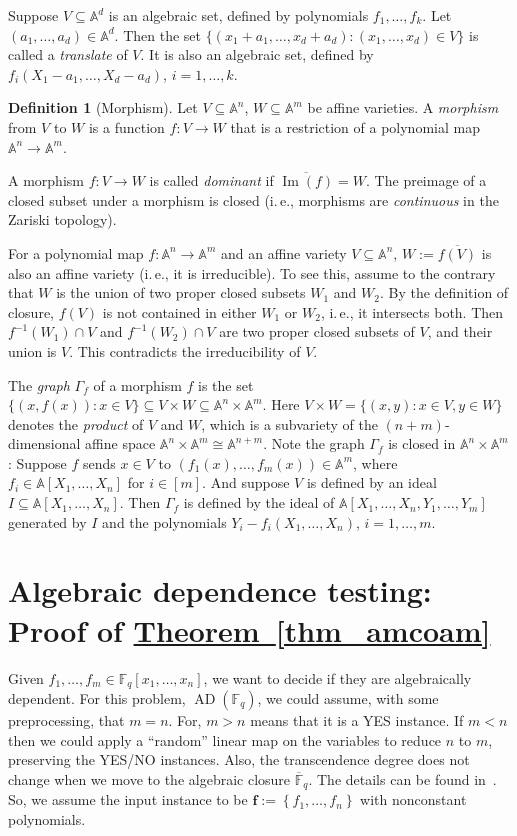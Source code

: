 \documentclass[11pt]{article}
\numberwithin{equation}{section}
\theoremstyle{definition}
\newtheorem{definition}[theorem]{Definition}
\theoremstyle{plain}
\newcommand{\ie}{i.\,e.}
\newcommand{\expref}[2]{\hyperref[#2]{#1~\ref{#2}}}
\newcommand{\F}{\mathbb{F}}
\newcommand{\aff}{\mathbb{A}}
\DeclareMathOperator{\im}{\mathrm{Im}}
\newcommand{\ol}[1]{\overline{#1}}
\newcommand{\inbrace }[1]{\left\{#1\right\}}
\DeclareMathOperator{\AD}{\mathrm{AD}\xspace} %
\begin{document}
%
Suppose $V\subseteq\aff^d$ is an algebraic set, defined by polynomials $f_1,\dots,f_k$. Let $(a_1,\dots,a_d)\in\aff^d$. Then the set $\{(x_1+a_1,\dots,x_d+a_d): (x_1,\dots,x_d)\in V\}$ is called a \emph{translate} of $V$. It is also an algebraic set, defined by $f_i(X_1-a_1,\dots,X_d-a_d)$, $i=1,\dots,k$.

%
\begin{definition}[Morphism] %
Let $V\subseteq \aff^n$, $W\subseteq\aff^m$ be affine varieties. A \emph{morphism} from $V$ to $W$ is a function $f:V\to W$ that is a restriction of a polynomial map $\aff^n\to\aff^m$.
\end{definition}

A morphism $f: V\to W$ is called \emph{dominant} if $\overline{\im(f)}=W$.
The preimage of a closed subset under a morphism is closed (\ie, morphisms are \emph{continuous} in the Zariski topology).

For a polynomial map $f:\aff^n\to\aff^m$ and an affine variety $V\subseteq \aff^n$, $W:=\overline{f(V)}$ is also an affine variety (\ie, it is irreducible). To see this, assume to the contrary that $W$ is the union of two proper closed subsets $W_1$ and $W_2$. By the definition of closure, $f(V)$ is not contained in either $W_1$ or $W_2$, \ie, it intersects both. Then $f^{-1}(W_1)\cap V$ and $f^{-1}(W_2)\cap V$ are two proper closed subsets of $V$, and their union is $V$. This contradicts the irreducibility of $V$.

%
The \emph{graph} $\Gamma_f$ of a morphism $f$ is the set $\{(x,f(x)): x\in V\}\subseteq V\times W\subseteq \aff^n\times \aff^m$.
Here $V\times W=\{(x,y): x\in V,y\in W\}$ denotes the \emph{product} of $V$ and $W$, which is a subvariety of the $(n+m)$-dimensional affine space $\aff^n\times \aff^m\cong \aff^{n+m}$.
Note the graph $\Gamma_f$ is closed in $\aff^n\times \aff^m$: 
Suppose $f$ sends $x\in V$ to $(f_1(x),\dots,f_m(x))\in\aff^m$, where $f_i\in\aff[X_1,\dots,X_n]$ for $i\in [m]$.
And suppose $V$ is defined by an ideal $I\subseteq \aff[X_1,\dots,X_n]$. Then $\Gamma_f$ is defined by the ideal of $\aff[X_1,\dots,X_n,Y_1,\dots,Y_m]$ generated by $I$ and the polynomials $Y_i-f_i(X_1,\dots,X_n)$, $i=1,\dots,m$. 

%
\section{Algebraic dependence testing: Proof of \expref{Theorem}{thm_amcoam} }\label{sec-dep}
%

Given $f_1,\dots,f_m\in \F_q[x_1,\dots,x_n]$, we want to decide if they are algebraically dependent. For this
%
problem, $\AD(\F_q)$,    %
we could assume, with some preprocessing, that $m=n$. For, $m>n$ means that
%
it is  %
a YES instance. If $m < n$ then we could apply a ``random'' linear map on the variables to reduce 
%
$n$ %
to $m$, preserving the YES/NO instances. Also, the transcendence degree does not change when we move to the algebraic closure $\ol{\F}_q$. The details can be found in~\cite[Lemmas~2.7--2.9]{pandey2016algebraic}. So, we assume the input instance to be $\mathbf f := \inbrace{f_1,\dots,f_n}$ with nonconstant polynomials.
 
\end{document}
